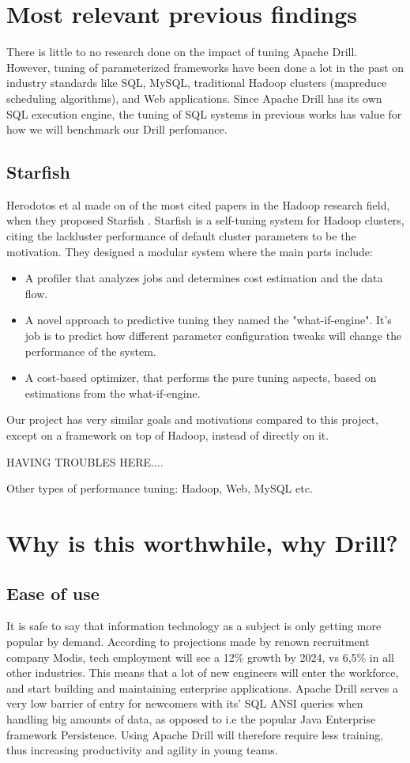 \documentclass[a4paper,english]{report}
\begin{document}
		\section{Most relevant previous findings}
		There is little to no research done on the impact of tuning Apache Drill. However, tuning of parameterized frameworks have been done a lot in the past on industry standards like SQL, MySQL, traditional Hadoop clusters (mapreduce scheduling algorithms), and Web applications. Since Apache Drill has its own SQL execution engine,  the tuning of SQL systems in previous works has value for how we will benchmark our Drill perfomance.
			\subsection{Starfish}
			Herodotos et al made on of the most cited papers in the Hadoop research field, when they proposed Starfish \cite{starfish}. Starfish is a self-tuning system for Hadoop clusters, citing the lackluster performance of default cluster parameters to be the motivation. They designed a modular system where the main parts include:
			\begin{itemize}
				\item A profiler that analyzes jobs and determines cost estimation and the data flow.
				\item A novel approach to predictive tuning they named the "what-if-engine". It's job is to predict how different parameter configuration tweaks will change the performance of the system.
				\item A cost-based optimizer, that performs the pure tuning aspects, based on estimations from the what-if-engine.
			\end{itemize}
			Our project has very similar goals and motivations compared to this project, except on a framework on top of Hadoop, instead of directly on it.
		
		
		HAVING TROUBLES HERE....
		
		Other types of performance tuning: Hadoop, Web, MySQL etc.
		
		\section{Why is this worthwhile, why Drill?}
		\label{sec:why_drill}
			\subsection{Ease of use}It is safe to say that information technology as a subject is only getting more popular by demand. According to projections made by renown recruitment company Modis, tech employment will see a 12\% growth by 2024, vs 6,5\% in all other industries\cite{modis}. This means that a lot of new engineers will enter the workforce, and start building and maintaining enterprise applications. Apache Drill serves a very low barrier of entry for newcomers with its' SQL ANSI queries when handling big amounts of data, as opposed to i.e the popular Java Enterprise framework Persistence. Using Apache Drill will therefore require less training, thus increasing productivity and agility in young teams.
\end{document}
